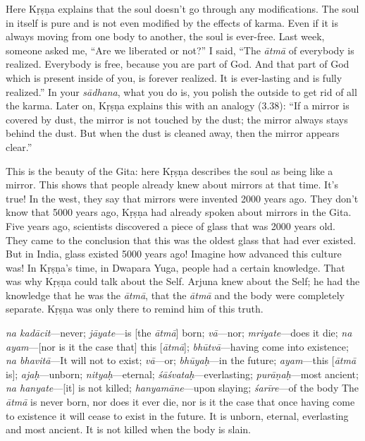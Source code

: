 Here Kṛṣṇa explains that the soul doesn’t go through any modifications. The soul in itself is pure and is not even modified by the effects of karma. Even if it is always moving from one body to another, the soul is ever-free. Last week, someone asked me, “Are we liberated or not?” I said, “The \textit{ātmā} of everybody is realized. Everybody is free, because you are part of God. And that part of God which is present inside of you, is forever realized. It is ever-lasting and is fully realized.” In your \textit{sādhana}, what you do is, you polish the outside to get rid of all the karma. Later on, Kṛṣṇa explains this with an analogy (3.38): “If a mirror is covered by dust, the mirror is not touched by the dust; the mirror always stays behind the dust. But when the dust is cleaned away, then the mirror appears clear.”

This is the beauty of the Gita: here Kṛṣṇa describes the soul as being like a mirror. This shows that people already knew about mirrors at that time. It’s true! In the west, they say that mirrors were invented 2000 years ago. They don’t know that 5000 years ago, Kṛṣṇa had already spoken about mirrors in the Gita. Five years ago, scientists discovered a piece of glass that was 2000 years old. They came to the conclusion that this was the oldest glass that had ever existed. But in India, glass existed 5000 years ago! Imagine how advanced this culture was! In Kṛṣṇa’s time, in Dwapara Yuga, people had a certain knowledge. That was why Kṛṣṇa could talk about the Self. Arjuna knew about the Self; he had the knowledge that he was the \textit{ātmā}, that the \textit{ātmā} and the body were completely separate. Kṛṣṇa was only there to remind him of this truth.

{%
  \textit{na kadācit}---never; 
  \textit{jāyate}---is [the \textit{ātmā}] born; 
  \textit{vā}---nor; 
  \textit{mriyate}---does it die; 
  \textit{na ayam}---[nor is it the case that] this [\textit{ātmā}]; 
  \textit{bhūtvā}---having come into existence; 
  \textit{na bhavitā}---It will not to exist; 
  \textit{vā}---or; 
  \textit{bhūyaḥ}---in the future; 
  \textit{ayam}---this [\textit{ātmā} is]; 
  \textit{ajaḥ}---unborn; 
  \textit{nityaḥ}---eternal; 
  \textit{śāśvataḥ}---everlasting; 
  \textit{purāṇaḥ}---most ancient; 
  \textit{na hanyate}---[it] is not killed; 
  \textit{hanyamāne}---upon slaying; 
  \textit{śarīre}---of the body
}
{%
  The \textit{ātmā} is never born, nor does it ever die, nor is it the case that once having come to existence it will cease to exist in the future. It is unborn, eternal, everlasting and most ancient. It is not killed when the body is slain.
}

